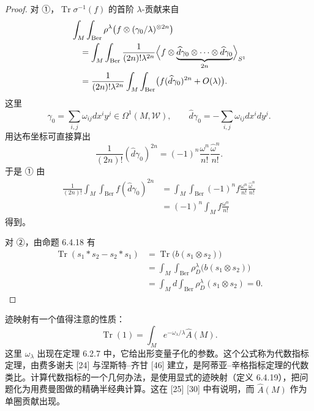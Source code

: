 \begin{proof}
  对 ①，$\operatorname{Tr}\sigma^{-1}(f)$ 的首阶 $\lambda$-贡献来自
  \begin{align*}
  &\int_M\int_{\mathrm{Ber}}
  \rho^\lambda\bigl(f\otimes(\gamma_0/\lambda)^{\otimes 2n}\bigr)\\
  &\quad=\int_M\int_{\mathrm{Ber}}\frac{1}{(2n)!\lambda^{2n}}
  \Bigl\langle f\otimes
  \underbrace{\widehat d\gamma_0\otimes\cdots\otimes\widehat d\gamma_0}_{2n}
  \Bigr\rangle_{S^1}\\
  &\quad=\frac{1}{(2n)!\lambda^{2n}}
  \int_M\int_{\mathrm{Ber}}
  \bigl(f(\widehat d\gamma_0)^{2n}+O(\lambda)\bigr).
  \end{align*}
  这里
  \[
  \gamma_0=\sum_{i,j}\omega_{ij}dx^iy^j\in\Omega^1(M,\mathcal W),
  \qquad
  \widehat d\gamma_0=-\sum_{i,j}\omega_{ij}dx^idy^j.
  \]
  用达布坐标可直接算出
  \[
  \frac{1}{(2n)!}(\widehat d\gamma_0)^{2n}
  =(-1)^n\frac{\omega^n}{n!}\frac{\widehat\omega^n}{n!}.
  \]
  于是 ① 由
  \begin{align*}
  \frac{1}{(2n)!}\int_M\int_{\mathrm{Ber}}f(\widehat d\gamma_0)^{2n}
  &=\int_M\int_{\mathrm{Ber}}(-1)^nf\frac{\omega^n}{n!}
  \frac{\widehat\omega^n}{n!}\\
  &=(-1)^n\int_Mf\frac{\omega^n}{n!}
  \end{align*}
  得到。

  对 ②，由命题 6.4.18 有
  \begin{align*}
  \operatorname{Tr}(s_1\ast s_2-s_2\ast s_1)
  &=\operatorname{Tr}\bigl(b(s_1\otimes s_2)\bigr)\\
  &=\int_M\int_{\mathrm{Ber}}\rho_D^\lambda\bigl(b(s_1\otimes s_2)\bigr)\\
  &=\int_Md\int_{\mathrm{Ber}}\rho_D^\lambda(s_1\otimes s_2)=0.
  \end{align*}
\end{proof}

迹映射有一个值得注意的性质：
\[
\operatorname{Tr}(1)=\int_Me^{-\omega_\lambda/\lambda}\hat A(M).
\]
这里 $\omega_\lambda$ 出现在定理 6.2.7 中，它给出形变量子化的参数。这个公式称为代数指标定理，由费多谢夫 [24] 与涅斯特–齐甘 [46] 建立，是阿蒂亚–辛格指标定理的代数类比。计算代数指标的一个几何办法，是使用显式的迹映射（定义 6.4.19），把问题化为用费曼图做的精确半经典计算。这在 [25] [30] 中有说明，而 $\hat A(M)$ 作为单圈贡献出现。













